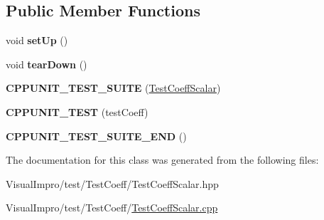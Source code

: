 \subsection*{Public Member Functions}
\begin{DoxyCompactItemize}
\item 
\mbox{\label{class_test_coeff_scalar_ab0900593efc9cb4a8f6e3809800fc1af}} 
void {\bfseries set\+Up} ()
\item 
\mbox{\label{class_test_coeff_scalar_a33031f10bb102b12022a7095f7f01473}} 
void {\bfseries tear\+Down} ()
\item 
\mbox{\label{class_test_coeff_scalar_ac3fe75c9594aa70984d290c6eab9bf5e}} 
{\bfseries C\+P\+P\+U\+N\+I\+T\+\_\+\+T\+E\+S\+T\+\_\+\+S\+U\+I\+TE} (\mbox{\hyperlink{class_test_coeff_scalar}{Test\+Coeff\+Scalar}})
\item 
\mbox{\label{class_test_coeff_scalar_af69fc0ad63d09ed2da55640f1cbc15f9}} 
{\bfseries C\+P\+P\+U\+N\+I\+T\+\_\+\+T\+E\+ST} (test\+Coeff)
\item 
\mbox{\label{class_test_coeff_scalar_ac92bf38691f10c66f847c5e0a4dd855a}} 
{\bfseries C\+P\+P\+U\+N\+I\+T\+\_\+\+T\+E\+S\+T\+\_\+\+S\+U\+I\+T\+E\+\_\+\+E\+ND} ()
\end{DoxyCompactItemize}


The documentation for this class was generated from the following files\+:\begin{DoxyCompactItemize}
\item 
Visual\+Impro/test/\+Test\+Coeff/Test\+Coeff\+Scalar.\+hpp\item 
Visual\+Impro/test/\+Test\+Coeff/\mbox{\hyperlink{_test_coeff_scalar_8cpp}{Test\+Coeff\+Scalar.\+cpp}}\end{DoxyCompactItemize}
